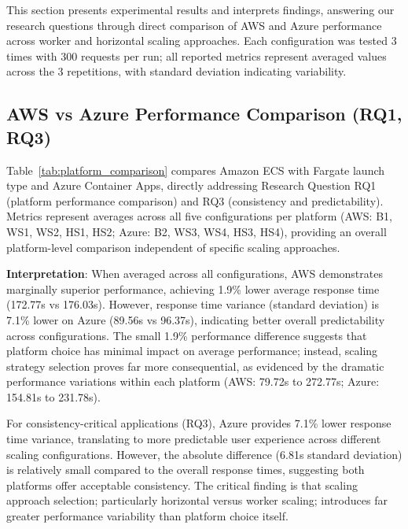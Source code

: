 This section presents experimental results and interprets findings, answering our research questions through direct comparison of AWS and Azure performance across worker and horizontal scaling approaches. Each configuration was tested 3 times with 300 requests per run; all reported metrics represent averaged values across the 3 repetitions, with standard deviation indicating variability.

\subsection{AWS vs Azure Performance Comparison (RQ1, RQ3)}

Table~\ref{tab:platform_comparison} compares Amazon ECS with Fargate launch type and Azure Container Apps, directly addressing Research Question RQ1 (platform performance comparison) and RQ3 (consistency and predictability). Metrics represent averages across all five configurations per platform (AWS: B1, WS1, WS2, HS1, HS2; Azure: B2, WS3, WS4, HS3, HS4), providing an overall platform-level comparison independent of specific scaling approaches.

\textbf{Interpretation}: When averaged across all configurations, AWS demonstrates marginally superior performance, achieving 1.9\% lower average response time (172.77s vs 176.03s). However, response time variance (standard deviation) is 7.1\% lower on Azure (89.56s vs 96.37s), indicating better overall predictability across configurations. The small 1.9\% performance difference suggests that platform choice has minimal impact on average performance; instead, scaling strategy selection proves far more consequential, as evidenced by the dramatic performance variations within each platform (AWS: 79.72s to 272.77s; Azure: 154.81s to 231.78s).

For consistency-critical applications (RQ3), Azure provides 7.1\% lower response time variance, translating to more predictable user experience across different scaling configurations. However, the absolute difference (6.81s standard deviation) is relatively small compared to the overall response times, suggesting both platforms offer acceptable consistency. The critical finding is that scaling approach selection; particularly horizontal versus worker scaling; introduces far greater performance variability than platform choice itself.

